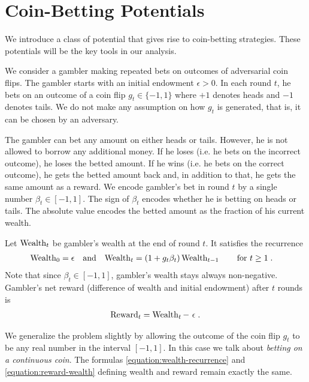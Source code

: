 \section{Coin-Betting Potentials}
\label{section:coin-betting-potentials}

We introduce a class of potential that gives rise to coin-betting strategies. These potentials will be the key tools in our analysis.

We consider a gambler making repeated bets on outcomes of adversarial coin
flips. The gambler starts with an initial endowment $\epsilon > 0$. In each
round $t$, he bets on an outcome of a coin flip $g_t \in \{-1,1\}$ where $+1$
denotes heads and $-1$ denotes tails. We do not make any assumption on how $g_t$
is generated, that is, it can be chosen by an adversary.

The gambler can bet any amount on either heads or tails. However, he is not
allowed to borrow any additional money. If he loses (i.e. he bets on the
incorrect outcome), he loses the betted amount. If he wins (i.e. he bets on the
correct outcome), he gets the betted amount back and, in addition to that, he
gets the same amount as a reward.
We encode gambler's bet in round $t$ by a single
number $\beta_t \in [-1,1]$. The sign of $\beta_t$ encodes whether he is betting
on heads or tails. The absolute value encodes the betted amount as the fraction
of his current wealth.

Let $\operatorname{Wealth}_t$ be gambler's wealth at the end of round $t$. It satisfies the
recurrence
\begin{align}
\label{equation:wealth-recurrence}
\operatorname{Wealth}_0 & = \epsilon &
& \text{and} &
\operatorname{Wealth}_t & = (1 + g_t \beta_t) \operatorname{Wealth}_{t-1} \qquad \text{for $t \ge 1$} \; .
\end{align}
Note that since $\beta_t \in [-1,1]$, gambler's wealth stays always non-negative.
Gambler's net reward (difference of wealth and initial endowment) after $t$
rounds is
\begin{align}
\label{equation:reward-wealth}
\operatorname{Reward}_t = \operatorname{Wealth}_t - \ \epsilon \; .
\end{align}

We generalize the problem slightly by allowing the outcome of the coin flip
$g_t$ to be any real number in the interval $[-1,1]$. In this case we talk about
\emph{betting on a continuous coin}. The formulas
\eqref{equation:wealth-recurrence} and \eqref{equation:reward-wealth} defining
wealth and reward remain exactly the same.

